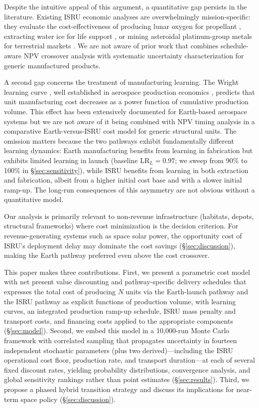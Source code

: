 \documentclass[preprint,12pt]{elsarticle}
\begin{document}
Despite the intuitive appeal of this argument, a quantitative gap persists in the literature. Existing ISRU economic analyses are overwhelmingly mission-specific: they evaluate the cost-effectiveness of producing lunar oxygen for propellant \cite{sanders2015}, extracting water ice for life support \cite{zubrin1996}, or mining asteroidal platinum-group metals for terrestrial markets \cite{sonter1997,elvis2012}. We are not aware of prior work that combines schedule-aware NPV crossover analysis with systematic uncertainty characterization for generic manufactured products.

A second gap concerns the treatment of manufacturing learning. The Wright learning curve \cite{wright1936}, well established in aerospace production economics \cite{wertz2011}, predicts that unit manufacturing cost decreases as a power function of cumulative production volume. This effect has been extensively documented for Earth-based aerospace systems \cite{argote1990,nagy2013} but we are not aware of it being combined with NPV timing analysis in a comparative Earth-versus-ISRU cost model for generic structural units. The omission matters because the two pathways exhibit fundamentally different learning dynamics: Earth manufacturing benefits from learning in fabrication but exhibits limited learning in launch (baseline $\mathrm{LR}_L = 0.97$; we sweep from 90\% to 100\% in \S\ref{sec:sensitivity}), while ISRU benefits from learning in both extraction and fabrication, albeit from a higher initial cost base and with a slower initial ramp-up. The long-run consequences of this asymmetry are not obvious without a quantitative model.

Our analysis is primarily relevant to non-revenue infrastructure (habitats, depots, structural frameworks) where cost minimization is the decision criterion. For revenue-generating systems such as space solar power, the opportunity cost of ISRU's deployment delay may dominate the cost savings (\S\ref{sec:discussion}), making the Earth pathway preferred even above the cost crossover.

This paper makes three contributions. First, we present a parametric cost model with net present value discounting and pathway-specific delivery schedules that expresses the total cost of producing $N$ units via the Earth-launch pathway and the ISRU pathway as explicit functions of production volume, with learning curves, an integrated production ramp-up schedule, ISRU mass penalty and transport costs, and financing costs applied to the appropriate components (\S\ref{sec:model}). Second, we embed this model in a 10{,}000-run Monte Carlo framework with correlated sampling that propagates uncertainty in fourteen independent stochastic parameters (plus two derived)---including the ISRU operational cost floor, production rate, and transport duration---at each of several fixed discount rates, yielding probability distributions, convergence analysis, and global sensitivity rankings rather than point estimates (\S\ref{sec:results}). Third, we propose a phased hybrid transition strategy and discuss its implications for near-term space policy (\S\ref{sec:discussion}).
\end{document}
